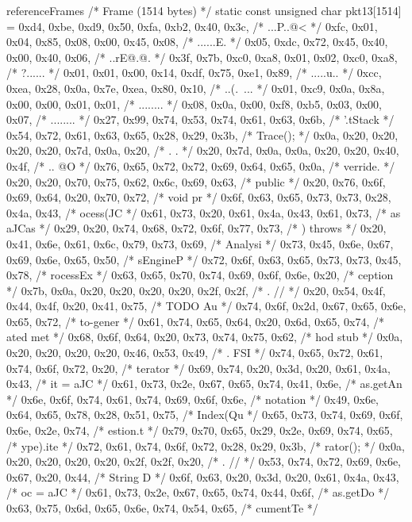 \begin{chunk}{referenceFrames}
{{{/* Frame (1514 bytes) */
static const unsigned char pkt13[1514] = {
0xd4, 0xbe, 0xd9, 0x50, 0xfa, 0xb2, 0x40, 0x3c, /* ...P..@< */
0xfc, 0x01, 0x04, 0x85, 0x08, 0x00, 0x45, 0x08, /* ......E. */
0x05, 0xdc, 0x72, 0x45, 0x40, 0x00, 0x40, 0x06, /* ..rE@.@. */
0x3f, 0x7b, 0xc0, 0xa8, 0x01, 0x02, 0xc0, 0xa8, /* ?{...... */
0x01, 0x01, 0x00, 0x14, 0xdf, 0x75, 0xe1, 0x89, /* .....u.. */
0xcc, 0xea, 0x28, 0x0a, 0x7e, 0xea, 0x80, 0x10, /* ..(.~... */
0x01, 0xc9, 0x0a, 0x8a, 0x00, 0x00, 0x01, 0x01, /* ........ */
0x08, 0x0a, 0x00, 0xf8, 0xb5, 0x03, 0x00, 0x07, /* ........ */
0x27, 0x99, 0x74, 0x53, 0x74, 0x61, 0x63, 0x6b, /* '.tStack */
0x54, 0x72, 0x61, 0x63, 0x65, 0x28, 0x29, 0x3b, /* Trace(); */
0x0a, 0x20, 0x20, 0x20, 0x20, 0x7d, 0x0a, 0x20, /* .    }.  */
0x20, 0x7d, 0x0a, 0x0a, 0x20, 0x20, 0x40, 0x4f, /*  }..  @O */
0x76, 0x65, 0x72, 0x72, 0x69, 0x64, 0x65, 0x0a, /* verride. */
0x20, 0x20, 0x70, 0x75, 0x62, 0x6c, 0x69, 0x63, /*   public */
0x20, 0x76, 0x6f, 0x69, 0x64, 0x20, 0x70, 0x72, /*  void pr */
0x6f, 0x63, 0x65, 0x73, 0x73, 0x28, 0x4a, 0x43, /* ocess(JC */
0x61, 0x73, 0x20, 0x61, 0x4a, 0x43, 0x61, 0x73, /* as aJCas */
0x29, 0x20, 0x74, 0x68, 0x72, 0x6f, 0x77, 0x73, /* ) throws */
0x20, 0x41, 0x6e, 0x61, 0x6c, 0x79, 0x73, 0x69, /*  Analysi */
0x73, 0x45, 0x6e, 0x67, 0x69, 0x6e, 0x65, 0x50, /* sEngineP */
0x72, 0x6f, 0x63, 0x65, 0x73, 0x73, 0x45, 0x78, /* rocessEx */
0x63, 0x65, 0x70, 0x74, 0x69, 0x6f, 0x6e, 0x20, /* ception  */
0x7b, 0x0a, 0x20, 0x20, 0x20, 0x20, 0x2f, 0x2f, /* {.    // */
0x20, 0x54, 0x4f, 0x44, 0x4f, 0x20, 0x41, 0x75, /*  TODO Au */
0x74, 0x6f, 0x2d, 0x67, 0x65, 0x6e, 0x65, 0x72, /* to-gener */
0x61, 0x74, 0x65, 0x64, 0x20, 0x6d, 0x65, 0x74, /* ated met */
0x68, 0x6f, 0x64, 0x20, 0x73, 0x74, 0x75, 0x62, /* hod stub */
0x0a, 0x20, 0x20, 0x20, 0x20, 0x46, 0x53, 0x49, /* .    FSI */
0x74, 0x65, 0x72, 0x61, 0x74, 0x6f, 0x72, 0x20, /* terator  */
0x69, 0x74, 0x20, 0x3d, 0x20, 0x61, 0x4a, 0x43, /* it = aJC */
0x61, 0x73, 0x2e, 0x67, 0x65, 0x74, 0x41, 0x6e, /* as.getAn */
0x6e, 0x6f, 0x74, 0x61, 0x74, 0x69, 0x6f, 0x6e, /* notation */
0x49, 0x6e, 0x64, 0x65, 0x78, 0x28, 0x51, 0x75, /* Index(Qu */
0x65, 0x73, 0x74, 0x69, 0x6f, 0x6e, 0x2e, 0x74, /* estion.t */
0x79, 0x70, 0x65, 0x29, 0x2e, 0x69, 0x74, 0x65, /* ype).ite */
0x72, 0x61, 0x74, 0x6f, 0x72, 0x28, 0x29, 0x3b, /* rator(); */
0x0a, 0x20, 0x20, 0x20, 0x20, 0x2f, 0x2f, 0x20, /* .    //  */
0x53, 0x74, 0x72, 0x69, 0x6e, 0x67, 0x20, 0x44, /* String D */
0x6f, 0x63, 0x20, 0x3d, 0x20, 0x61, 0x4a, 0x43, /* oc = aJC */
0x61, 0x73, 0x2e, 0x67, 0x65, 0x74, 0x44, 0x6f, /* as.getDo */
0x63, 0x75, 0x6d, 0x65, 0x6e, 0x74, 0x54, 0x65, /* cumentTe */
}}}}
\end{chunk}
